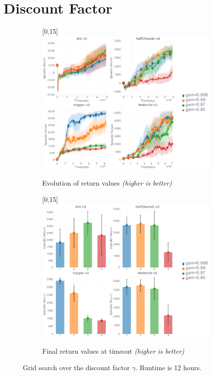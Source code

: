 \section{Discount Factor}
\label{ablationdiscount}

\begin{figure}[H]
  \center
  \begin{subfigure}[t]{0.49\textwidth}
    \center\scalebox{0.15}[0.15]{\includegraphics{Plots/fig19_discount_gs_4envs/plots_eval_env_ret_plot.pdf}}
    \caption{Evolution of return values \textit{(higher is better)}}
  \end{subfigure}
  \begin{subfigure}[t]{0.49\textwidth}
    \center\scalebox{0.15}[0.15]{\includegraphics{Plots/fig19_discount_gs_4envs/plots_eval_env_ret_barplot.pdf}}
    \caption{Final return values at timeout \textit{(higher is better)}}
  \end{subfigure}
  \caption{
  Grid search over the discount factor $\gamma$.
  Runtime is 12 hours.}
\end{figure}


